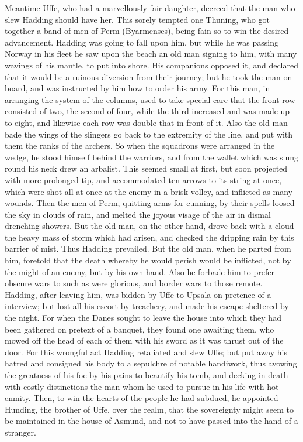 \documentclass[10pt,a4paper]{report}
\begin{document}
Meantime Uffe, who had a marvellously fair daughter, decreed that the man who slew Hadding should have her. This sorely tempted one Thuning, who got together a band of men of Perm (Byarmenses), being fain so to win the desired advancement. Hadding was going to fall upon him, but while he was passing Norway in his fleet he saw upon the beach an old man signing to him, with many wavings of his mantle, to put into shore. His companions opposed it, and declared that it would be a ruinous diversion from their journey; but he took the man on board, and was instructed by him how to order his army. For this man, in arranging the system of the columns, used to take special care that the front row consisted of two, the second of four, while the third increased and was made up to eight, and likewise each row was double that in front of it. Also the old man bade the wings of the slingers go back to the extremity of the line, and put with them the ranks of the archers. So when the squadrons were arranged in the wedge, he stood himself behind the warriors, and from the wallet which was slung round his neck drew an arbalist. This seemed small at first, but soon projected with more prolonged tip, and accommodated ten arrows to its string at once, which were shot all at once at the enemy in a brisk volley, and inflicted as many wounds. Then the men of Perm, quitting arms for cunning, by their spells loosed the sky in clouds of rain, and melted the joyous visage of the air in dismal drenching showers. But the old man, on the other hand, drove back with a cloud the heavy mass of storm which had arisen, and checked the dripping rain by this barrier of mist. Thus Hadding prevailed. But the old man, when he parted from him, foretold that the death whereby he would perish would be inflicted, not by the might of an enemy, but by his own hand. Also he forbade him to prefer obscure wars to such as were glorious, and border wars to those remote.\\

Hadding, after leaving him, was bidden by Uffe to Upsala on pretence of a interview; but lost all his escort by treachery, and made his escape sheltered by the night. For when the Danes sought to leave the house into which they had been gathered on pretext of a banquet, they found one awaiting them, who mowed off the head of each of them with his sword as it was thrust out of the door. For this wrongful act Hadding retaliated and slew Uffe; but put away his hatred and consigned his body to a sepulchre of notable handiwork, thus avowing the greatness of his foe by his pains to beautify his tomb, and decking in death with costly distinctions the man whom he used to pursue in his life with hot enmity. Then, to win the hearts of the people he had subdued, he appointed Hunding, the brother of Uffe, over the realm, that the sovereignty might seem to be maintained in the house of Asmund, and not to have passed into the hand of a stranger.\\
\end{document}
